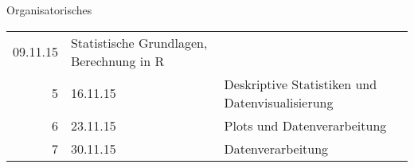 \documentclass[ignorenonframetext,]{beamer}
\newcommand{\R}{\textsf{R}}
\begin{document}
\begin{frame}{Organisatorisches}
\begin{longtable}[c]{@{}rll@{}}
\begin{minipage}[t]{0.18\columnwidth}\raggedright\strut
09.11.15
\strut\end{minipage} &
\begin{minipage}[t]{0.46\columnwidth}\raggedright\strut
Statistische Grundlagen, Berechnung in \R{}
\strut\end{minipage}\tabularnewline
\begin{minipage}[t]{0.18\columnwidth}\raggedleft\strut
5
\strut\end{minipage} &
\begin{minipage}[t]{0.18\columnwidth}\raggedright\strut
16.11.15
\strut\end{minipage} &
\begin{minipage}[t]{0.46\columnwidth}\raggedright\strut
Deskriptive Statistiken und Datenvisualisierung
\strut\end{minipage}\tabularnewline
\begin{minipage}[t]{0.18\columnwidth}\raggedleft\strut
6
\strut\end{minipage} &
\begin{minipage}[t]{0.18\columnwidth}\raggedright\strut
23.11.15
\strut\end{minipage} &
\begin{minipage}[t]{0.46\columnwidth}\raggedright\strut
Plots und Datenverarbeitung
\strut\end{minipage}\tabularnewline
\begin{minipage}[t]{0.18\columnwidth}\raggedleft\strut
7
\strut\end{minipage} &
\begin{minipage}[t]{0.18\columnwidth}\raggedright\strut
30.11.15
\strut\end{minipage} &
\begin{minipage}[t]{0.46\columnwidth}\raggedright\strut
Datenverarbeitung
\strut\end{minipage}\tabularnewline
\bottomrule
\end{longtable}

\end{frame}
\end{document}
